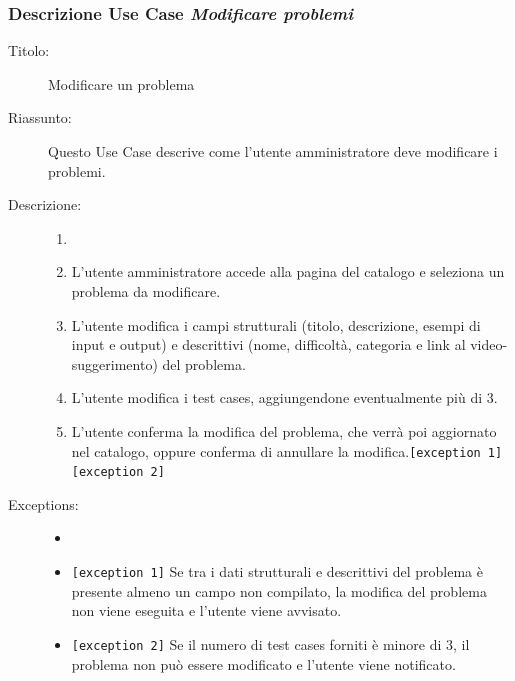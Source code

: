 \documentclass[11pt, a4paper]{article}
\theoremstyle{definition} %
\begin{document}
\subsubsection*{Descrizione Use Case \textit{Modificare problemi}}
\begin{description}
    \item[Titolo:] Modificare un problema
    
    \item[Riassunto:] Questo Use Case descrive come l'utente amministratore
    deve modificare i problemi.

    \item[Descrizione:]
    \begin{enumerate}
        \item[]
        \item L'utente amministratore accede alla pagina del catalogo e seleziona un problema da modificare.
        \item L'utente modifica i campi strutturali (titolo, descrizione, esempi di input e output) e descrittivi (nome, difficoltà, categoria e link al video-suggerimento) del problema.
        \item L'utente modifica i test cases, aggiungendone eventualmente più di 3.
        \item L'utente conferma la modifica del problema, che verrà poi aggiornato nel catalogo, oppure conferma di annullare la modifica.\texttt{[exception 1]} \texttt{[exception 2]}
    \end{enumerate}
    
    \item[Exceptions:]
    \begin{itemize}
        \item[]
        \item \texttt{[exception 1]} Se tra i dati strutturali e descrittivi del problema è presente almeno un campo non compilato, la modifica del problema non viene eseguita e l'utente viene avvisato.
        \item \texttt{[exception 2]} Se il numero di test cases forniti è minore di 3, il problema non può essere modificato e l'utente viene notificato.
    \end{itemize}
\end{description}
\end{document}
